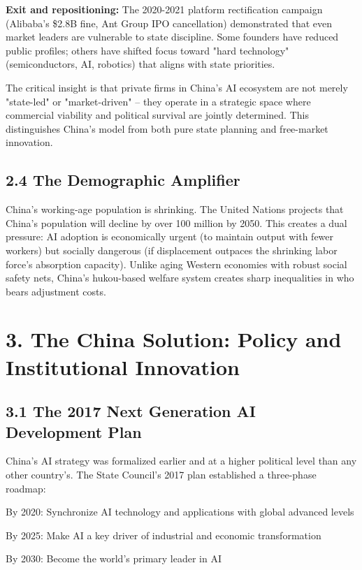\documentclass[11pt,a4paper]{article}
\begin{document}
\textbf{Exit and repositioning:} The 2020-2021 platform rectification campaign (Alibaba's \$2.8B fine, Ant Group IPO cancellation) demonstrated that even market leaders are vulnerable to state discipline. Some founders have reduced public profiles; others have shifted focus toward "hard technology" (semiconductors, AI, robotics) that aligns with state priorities.

The critical insight is that private firms in China's AI ecosystem are not merely "state-led" or "market-driven" -- they operate in a strategic space where commercial viability and political survival are jointly determined. This distinguishes China's model from both pure state planning and free-market innovation.

\subsection{2.4 The Demographic Amplifier}

China's working-age population is shrinking. The United Nations projects that China's population will decline by over 100 million by 2050. This creates a dual pressure: AI adoption is economically urgent (to maintain output with fewer workers) but socially dangerous (if displacement outpaces the shrinking labor force's absorption capacity). Unlike aging Western economies with robust social safety nets, China's hukou-based welfare system creates sharp inequalities in who bears adjustment costs.


\section{3. The China Solution: Policy and Institutional Innovation}

\subsection{3.1 The 2017 Next Generation AI Development Plan}

China's AI strategy was formalized earlier and at a higher political level than any other country's. The State Council's 2017 plan established a three-phase roadmap:
\item By 2020: Synchronize AI technology and applications with global advanced levels
\item By 2025: Make AI a key driver of industrial and economic transformation
\item By 2030: Become the world's primary leader in AI
\end{document}
